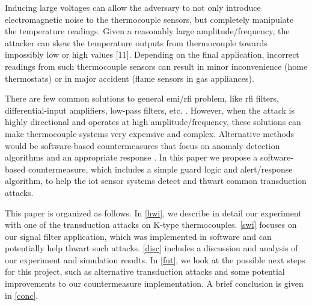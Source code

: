 Inducing large voltages can allow the adversary to not only introduce electromagnetic noise to the thermocouple sensors, but completely manipulate the temperature readings. Given a reasonably large amplitude/frequency, the attacker can skew the temperature outputs from thermocouple towards impossibly low or high values [11]. Depending on the final application, incorrect readings from such thermocouple sensors can result in minor inconvenience (home thermostats) or in major accident (flame sensors in gas appliances). 

There are few common solutions to general \ac{emi}/\ac{rfi} problem, like \ac{rfi} filters, differential-input amplifiers, low-pass filters, etc. \cite{Duff10}. However, when the attack is highly directional and operates at high amplitude/frequency, these solutions can make thermocouple systems very expensive and complex. Alternative methods would be software-based countermeasures that focus on anomaly detection algorithms and an appropriate response \cite{Amitai16}. In this paper we propose a software-based countermeasure, which includes a simple guard logic and alert/response algorithm, to help the \ac{iot} sensor systems detect and thwart common transduction attacks.

This paper is organized as follows. In \cref{hwi}, we describe in detail our experiment with one of the transduction attacks on K-type thermocouples. \cref{swi} focuses on our signal filter application, which was implemented in software and can potentially help thwart such attacks. \cref{disc} includes a discussion and analysis of our experiment and simulation results. In \cref{fut}, we look at the possible next steps for this project, such as alternative transduction attacks and some potential improvements to our countermeasure implementation. A brief conclusion is given in \cref{conc}.


